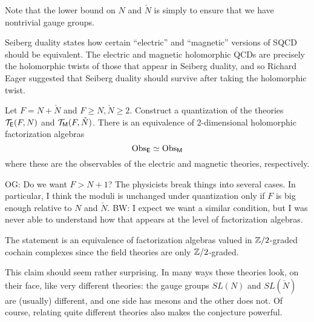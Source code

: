 \documentclass[11pt]{amsart}
\def\SU{{\rm SU}}
\def\brian#1{{\textcolor{blue!65!red}{BW: {#1}}}}
\def\owen#1{{\textcolor{violet!65!black}{OG: {#1}}}}
\begin{document}
Note that the lower bound on $N$ and $\check{N}$ is simply to ensure that we have nontrivial gauge groups.


Seiberg duality states how certain ``electric'' and ``magnetic'' versions of SQCD should be equivalent.
The electric and magnetic holomorphic QCDs are precisely the holomorphic twists of those that appear in Seiberg duality,
and so Richard Eager suggested that Seiberg duality should survive after taking the holomorphic twist.

\begin{conj}
Let $F = N + \check{N}$ and $F \geq N, \check{N} \geq 2$.
Construct a quantization of the theories $\mathcal T_{\mathsf E}(F,N)$ and $\mathcal T_{{\sf M}}(F,\check{N})$.
There is an equivalence of 2-dimensional holomorphic factorization algebras
\[
{\rm Obs}_{\mathsf E} \simeq {\rm Obs}_{{\sf M}}  
\]
where these are the observables of the electric and magnetic theories, respectively.
\end{conj}

\owen{Do we want $F > N+1$? The physicists break things into several cases. In particular, I think the moduli is unchanged under quantization only if $F$ is big enough relative to $N$ and $\check{N}$.}
\brian{I expect we want a similar condition, but I was never able to understand how that appears at the level of factorization algebras.}

\begin{rmk}
The statement is an equivalence of factorization algebras valued in $\mathbb Z/2$-graded cochain complexes since the field theories are only $\mathbb Z/2$-graded.
\end{rmk}

This claim should seem rather surprising.
In many ways these theories look, on their face, like very different theories:
the gauge groups $SL(N)$ and $SL(\check{N})$ are (usually) different, and
one side has mesons and the other does not.
Of course, relating quite different theories also makes the conjecture powerful.
\end{document}
